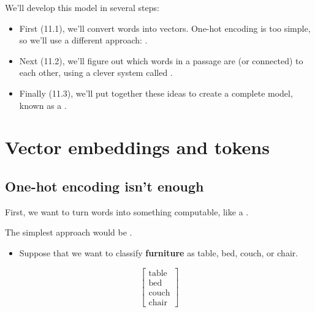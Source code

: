     


    We'll develop this model in several steps:

    \begin{itemize}
        \item First (11.1), we'll convert words into vectors. One-hot encoding is too simple, so we'll use a different approach: .

        \item Next (11.2), we'll figure out which words in a passage are (or connected) to each other, using a clever system called .

        \item Finally (11.3), we'll put together these ideas to create a complete model, known as a .
    \end{itemize}






\pagebreak
\section{Vector embeddings and tokens}

    \subsection{One-hot encoding isn't enough}

        First, we want to turn words into something computable, like a .
    
        The simplest approach would be .
            
        \begin{itemize}
            \item \miniex Suppose that we want to classify \textbf{furniture} as table, bed, couch, or chair.
        \end{itemize}
        
        \begin{equation}
            \begin{bmatrix}
              \text{table} \\ \text{bed} \\ \text{couch} \\ \text{chair} 
            \end{bmatrix}
        \end{equation}

